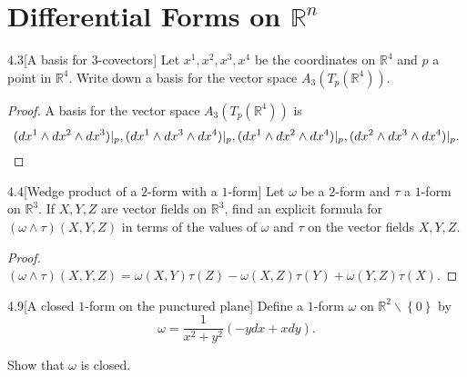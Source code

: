 \section{Differential Forms on \( \mathbb{R}^{n} \)}

\begin{exercise}{4.3}[A basis for \(3\)-covectors]
	Let \(x^{1}, x^{2}, x^{3}, x^{4}\) be the coordinates on \(\mathbb{R}^{4}\) and \(p\) a point in \(\mathbb{R}^{4}\). Write down a basis for the vector space \(A_{3}(T_{p}(\mathbb{R}^{4}))\).
\end{exercise}

\begin{proof}
	A basis for the vector space \(A_{3}(T_{p}(\mathbb{R}^{4}))\) is
	\[
		(dx^{1} \wedge dx^{2} \wedge dx^{3})\vert_{p}, (dx^{1} \wedge dx^{3} \wedge dx^{4})\vert_{p}, (dx^{1} \wedge dx^{2} \wedge dx^{4})\vert_{p}, (dx^{2} \wedge dx^{3} \wedge dx^{4})\vert_{p}. \qedhere
	\]
\end{proof}

\begin{exercise}{4.4}[Wedge product of a \(2\)-form with a \(1\)-form]
	Let \(\omega\) be a \(2\)-form and \(\tau\) a \(1\)-form on \(\mathbb{R}^{3}\). If \(X, Y, Z\) are vector fields on \(\mathbb{R}^{3}\), find an explicit formula for \((\omega \wedge \tau)(X, Y, Z)\) in terms of the values of \(\omega\) and \(\tau\) on the vector fields \(X, Y, Z\).
\end{exercise}

\begin{proof}
	\( (\omega \wedge \tau)(X, Y, Z) = \omega(X, Y)\tau(Z) - \omega(X, Z)\tau(Y) + \omega(Y, Z)\tau(X) \).
\end{proof}

\begin{exercise}{4.9}[A closed \(1\)-form on the punctured plane]
	Define a \(1\)-form \(\omega\) on \( \mathbb{R}^{2}\smallsetminus \left\{0\right\} \) by
	\[
		\omega = \frac{1}{x^{2} + y^{2}}(-ydx + xdy).
	\]

	Show that \(\omega\) is closed.
\end{exercise}

